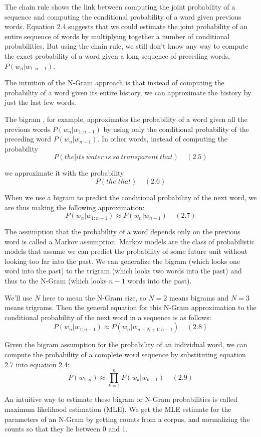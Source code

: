 The chain rule shows the link between computing the joint probability of a sequence and computing the conditional probability of a word given previous words. Equation 2.4 suggests that we could estimate the joint probability of an entire sequence of words by multiplying together a number of conditional probabilities. But using the chain rule, we still don't know any way to compute the exact probability of a word given a long sequence of preceding words, $P(w_n|w_{1:n-1})$.

The intuition of the N-Gram approach is that instead of computing the probability of a word given its entire history, we can approximate the history by just the last few words.

The bigram , for example, approximates the probability of a word given all the previous words $P(w_n|w_{1:n-1})$ by using only the conditional probability of the preceding word $P(w_n|w_{n-1})$. In other words, instead of computing the probability 
$$
	P(the|its \ water \ is \ so \ transparent \ that)\ \ \ \ \ (2.5)
$$

we approximate it with the probability
$$
	P(the|that)\ \ \ \ \ (2.6)
$$

When we use a bigram to predict the conditional probability of the next word, we are thus making the following approximation:
$$
	P(w_n|w_{1:n-1})\approx P(w_n|w_{n-1})\ \ \ \ \ (2.7)
$$

The assumption that the probability of a word depends only on the previous word is called a Markov assumption. Markov models are the class of probabilistic models that assume we can predict the probability of some future unit without looking too far into the past. We can generalize the bigram (which looks one word into the past) to the trigram (which looks two words into the past) and thus to the N-Gram (which looks $n-1$ words into the past).

We'll use $N$ here to mean the N-Gram size, so $N=2$ means bigrams and $N=3$ means trigrams. Then the general equation for this N-Gram approximation to the conditional probability of the next word in a sequence is as follows:
$$
	P(w_n|w_{1:n-1})\approx P(w_n|w_{n-N+1:n-1})\ \ \ \ \ (2.8)
$$

Given the bigram assumption for the probability of an individual word, we can compute the probability of a complete word sequence by substituting equation 2.7 into equation 2.4:
$$
	P(w_{1:n})\approx \prod_{k=1}^n P(w_k|w_{k-1})\ \ \ \ \ (2.9)
$$

An intuitive way to estimate these bigram or N-Gram probabilities is called maximum likelihood estimation (MLE). We get the MLE estimate for the parameters of an N-Gram by getting counts from a corpus, and normalizing the counts so that they lie between 0 and 1.


